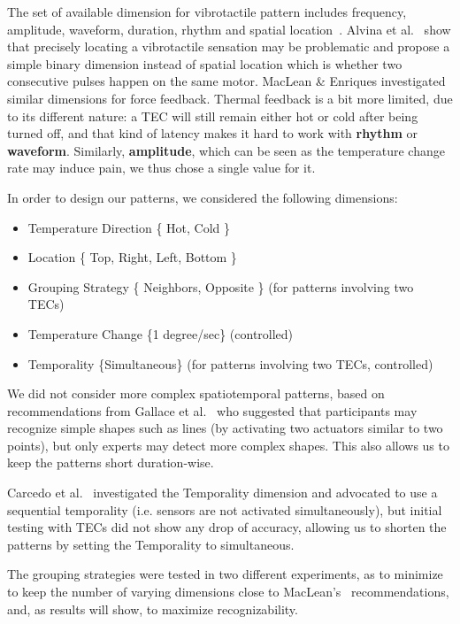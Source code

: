\documentclass[preprint,12pt]{elsarticle}
\begin{document}
The set of available dimension for vibrotactile pattern includes frequency, amplitude, waveform, duration, rhythm and spatial location~\cite{Brown2005,Chan2008,MacLean2008}. Alvina et al.~\cite{Alvina2015} show that precisely locating a vibrotactile sensation may be problematic and propose a simple binary dimension instead of spatial location which is whether two consecutive pulses happen on the same motor.
MacLean \& Enriques investigated similar dimensions for force feedback.
Thermal feedback is a bit more limited, due to its different nature: a TEC will still remain either hot or cold after being turned off, and that kind of latency makes it hard to work with \textbf{rhythm} or \textbf{waveform}.
Similarly, \textbf{amplitude}, which can be seen as the temperature change rate may induce pain, we thus chose a single value for it.

In order to design our patterns, we considered the following dimensions:
\begin{itemize}
\item Temperature Direction \{ Hot, Cold \}
\item Location \{ Top, Right, Left, Bottom \}
\item Grouping Strategy \{ Neighbors, Opposite \} (for patterns involving two TECs)
\item Temperature Change \{1 degree/sec\} (controlled)
\item Temporality \{Simultaneous\} (for patterns involving two TECs, controlled)
\end{itemize}

We did not consider more complex spatiotemporal patterns, based on recommendations from Gallace et al.~\cite{Gallace2007} who suggested that participants may recognize simple shapes such as lines (by activating two actuators similar to two points), but only experts may detect more complex shapes. This also allows us to keep the patterns short duration-wise.

Carcedo et al.~\cite{1} investigated the Temporality dimension and advocated to use a sequential temporality (i.e. sensors are not activated simultaneously), but initial testing with TECs did not show any drop of accuracy, allowing us to shorten the patterns by setting the Temporality to simultaneous.

The grouping strategies were tested in two different experiments, as to minimize to keep the number of varying dimensions close to MacLean's~\cite{MacLean2008} recommendations, and, as results will show, to maximize recognizability.
\end{document}
